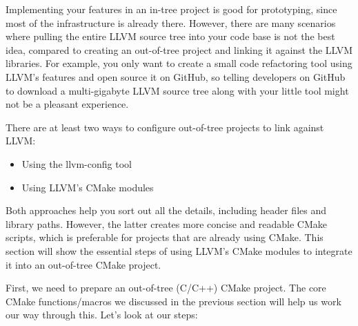 Implementing your features in an in-tree project is good for prototyping, since most of the infrastructure is already there. However, there are many scenarios where pulling the entire LLVM source tree into your code base is not the best idea, compared to creating an out-of-tree project and linking it against the LLVM libraries. For example, you only want to create a small code refactoring tool using LLVM's features and open source it on GitHub, so telling developers on GitHub to download a multi-gigabyte LLVM source tree along with your little tool might not be a pleasant experience.

There are at least two ways to configure out-of-tree projects to link against LLVM:

\begin{itemize}
\item Using the llvm-config tool

\item Using LLVM's CMake modules
	
\end{itemize}

Both approaches help you sort out all the details, including header files and library paths. However, the latter creates more concise and readable CMake scripts, which is preferable for projects that are already using CMake. This section will show the essential steps of using LLVM's CMake modules to integrate it into an out-of-tree CMake project.

First, we need to prepare an out-of-tree (C/C++) CMake project. The core CMake functions/macros we discussed in the previous section will help us work our way through this. Let's look at our steps:

